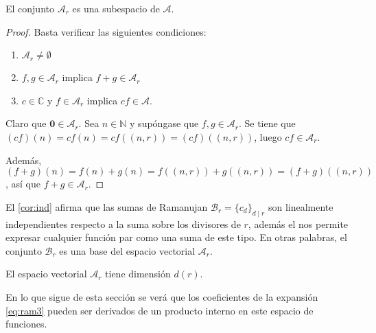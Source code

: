 \begin{proposition}
El conjunto $\mathcal{A}_r$ es una subespacio de $\mathcal{A}$.
\end{proposition}
\begin{proof}
Basta verificar las siguientes condiciones:
\begin{enumerate}[label=\textnormal{(\roman*)}]
\item $\mathcal{A}_r \ne \emptyset$
\item $f, g \in \mathcal{A}_r$ implica $f+g \in \mathcal{A}_r$
\item $c \in \mathbb{C}$ y $f \in \mathcal{A}_r$ implica $c f \in \mathcal{A}$.
\end{enumerate}
Claro que $\mathbf{0} \in \mathcal{A}_r$. Sea $n \in \mathbb{N}$ y supóngase que $f, g \in \mathcal{A}_r$. Se tiene que $(c f)(n) = c f(n) = c f((n,r)) = (c f)((n,r))$, luego $c f \in \mathcal{A}_r$.
\bigskip

Además, $(f+g)(n)=f(n)+g(n)=f((n,r))+g((n,r))=(f+g)((n,r))$, así que $f+g \in \mathcal{A}_r$.
\bigskip
\end{proof}

El \cref{cor:ind} afirma que las sumas de Ramanujan $\mathcal{B}_r = \{ c_d \}_{d \mid r}$ son linealmente independientes respecto a la suma sobre los divisores de $r$, además el  nos permite expresar cualquier función par como una suma de este tipo. En otras palabras, el conjunto $\mathcal{B}_r$ es una base del espacio vectorial $\mathcal{A}_r$.

\begin{corollary}
El espacio vectorial $\mathcal{A}_r$ tiene dimensión $d(r)$.
\end{corollary}

En lo que sigue de esta sección se verá que los coeficientes de la expansión \eqref{eq:ram3} pueden ser derivados de un producto interno en este espacio de funciones.

